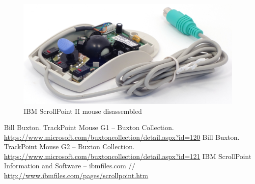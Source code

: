 \documentclass[11pt, a4paper]{article}
\begin{document}
\begin{figure}[h]
    \centering
    \includegraphics[scale=0.7]{2000_ibm_scrollpoint_ii_mouse/inside_30.jpg} 
    \caption{IBM ScrollPoint II mouse disassembled}
    \label{fig:IBMPS2Inside}
\end{figure}

\begin{thebibliography}{9}
     Bill Buxton. TrackPoint Mouse G1 -- Buxton Collection. \url{https://www.microsoft.com/buxtoncollection/detail.aspx?id=120}
     Bill Buxton. TrackPoint Mouse G2 -- Buxton Collection. \url{https://www.microsoft.com/buxtoncollection/detail.aspx?id=121}
     IBM ScrollPoint Information and Software -- ibmfiles.com // \url{http://www.ibmfiles.com/pages/scrollpoint.htm}
\end{thebibliography}
\end{document}
